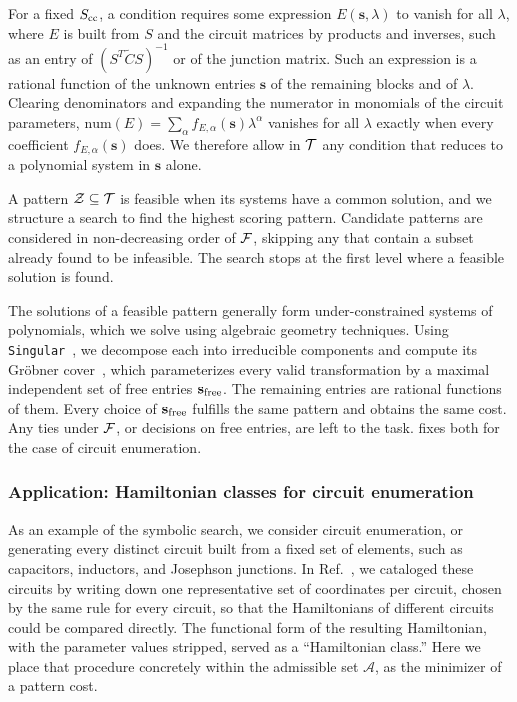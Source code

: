 For a fixed $S_{\rm cc}$, a condition requires some expression $E(\mathbf{s},\lambda)$ to vanish for all $\lambda$, where $E$ is built from $S$ and the circuit matrices by products and inverses, such as an entry of $(S^T\tilde{C}S)^{-1}$ or of the junction matrix.
Such an expression is a rational function of the unknown entries $\mathbf{s}$ of the remaining blocks and of $\lambda$.
Clearing denominators and expanding the numerator in monomials of the circuit parameters, $\text{num}(E) = \sum_{\alpha} f_{E,\alpha}(\mathbf{s}) \lambda^{\alpha}$ vanishes for all $\lambda$ exactly when every coefficient $f_{E,\alpha}(\mathbf{s})$ does.
We therefore allow in $\mathcal{T}$ any condition that reduces to a polynomial system in $\mathbf{s}$ alone.

A pattern $\mathcal{Z} \subseteq \mathcal{T}$ is feasible when its systems have a common solution, and we structure a search to find the highest scoring pattern.
Candidate patterns are considered in non-decreasing order of $\mathcal{F}$, skipping any that contain a subset already found to be infeasible.
The search stops at the first level where a feasible solution is found.

The solutions of a feasible pattern generally form under-constrained systems of polynomials, which we solve using algebraic geometry techniques.
Using \texttt{Singular}~\cite{Singular_2024}, we decompose each into irreducible components and compute its Gr\"obner cover~\cite{montes_wibmer_groebner_cover_2010}, which parameterizes every valid transformation by a maximal independent set of free entries $\mathbf{s}_{\rm free}$.
The remaining entries are rational functions of them.
Every choice of $\mathbf{s}_{\rm free}$ fulfills the same pattern and obtains the same cost.
Any ties under $\mathcal{F}$, or decisions on free entries, are left to the task.
 fixes both for the case of circuit enumeration.

\subsubsection{Application: Hamiltonian classes for circuit enumeration}\label{sec:Enumeration}

As an example of the symbolic search, we consider circuit enumeration, or generating every distinct circuit built from a fixed set of elements, such as capacitors, inductors, and Josephson junctions.
In Ref.~\cite{weissler2026enumerationsuperconductingcircuits5}, we cataloged these circuits by writing down one representative set of coordinates per circuit, chosen by the same rule for every circuit, so that the Hamiltonians of different circuits could be compared directly.
The functional form of the resulting Hamiltonian, with the parameter values stripped, served as a ``Hamiltonian class.''
Here we place that procedure concretely within the admissible set $\mathcal{A}$, as the minimizer of a pattern cost.

